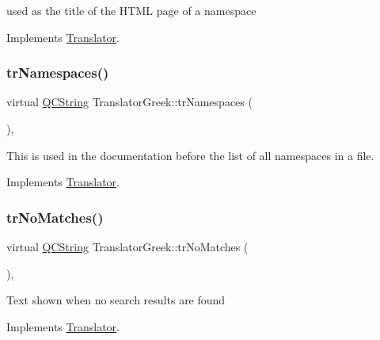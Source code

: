 used as the title of the H\+T\+ML page of a namespace 

Implements \mbox{\hyperlink{class_translator}{Translator}}.

\mbox{\label{class_translator_greek_a837c963b7763a2bbf4ffdd3c347d01ba}} 
\subsubsection{\texorpdfstring{trNamespaces()}{trNamespaces()}}
{\footnotesize\ttfamily virtual \mbox{\hyperlink{class_q_c_string}{Q\+C\+String}} Translator\+Greek\+::tr\+Namespaces (\begin{DoxyParamCaption}{ }\end{DoxyParamCaption})\hspace{0.3cm}{\ttfamily [inline]}, {\ttfamily [virtual]}}

This is used in the documentation before the list of all namespaces in a file. 

Implements \mbox{\hyperlink{class_translator}{Translator}}.

\mbox{\label{class_translator_greek_aa54e6e997c2c6cffeefc08ed6b54713d}} 
\subsubsection{\texorpdfstring{trNoMatches()}{trNoMatches()}}
{\footnotesize\ttfamily virtual \mbox{\hyperlink{class_q_c_string}{Q\+C\+String}} Translator\+Greek\+::tr\+No\+Matches (\begin{DoxyParamCaption}{ }\end{DoxyParamCaption})\hspace{0.3cm}{\ttfamily [inline]}, {\ttfamily [virtual]}}

Text shown when no search results are found 

Implements \mbox{\hyperlink{class_translator}{Translator}}.

\mbox{\label{class_translator_greek_a50bb4aebcb733c3c1f2427cdb17ea186}} 
